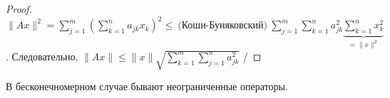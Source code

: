 \begin{proof}
    $\|Ax\|^2 = \sum\limits_{j=1}^m \left(\sum\limits_{k=1}^n a_{jk} x_k \right)^2 \le\ \text{(Коши-Буняковский)}\ \sum\limits_{j=1}^m \sum\limits_{k=1}^n a_{jk}^2 \underbrace{\sum\limits_{k=1}^n x_k^2}_{=\|x\|^2}$. Следовательно, $\|Ax\| \le \|x\| \sqrt{\sum\limits_{k=1}^m \sum\limits_{j=1}^n a_{jk}^2}$ /
\end{proof}
\begin{remark}
    В бесконечномерном случае бывают неограниченные операторы.
\end{remark}

